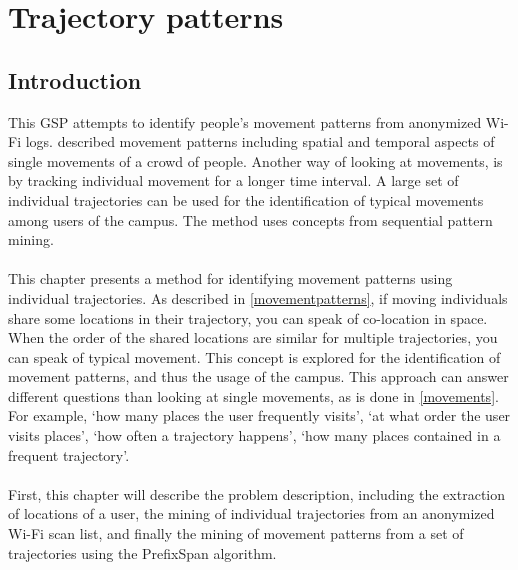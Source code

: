 \chapter{Trajectory patterns}\label{trajectories}
\section{Introduction}
This GSP attempts to identify people's movement patterns from anonymized Wi-Fi logs.  described movement patterns including spatial and temporal aspects of single movements of a crowd of people. Another way of looking at movements, is by tracking individual movement for a longer time interval. A large set of individual trajectories can be used for the identification of typical movements among users of the campus. The method uses concepts from sequential pattern mining. \\\\
This chapter presents a method for identifying movement patterns using individual trajectories. As described in \autoref{movementpatterns}, if moving individuals share some locations in their trajectory, you can speak of co-location in space. When the order of the shared locations are similar for multiple trajectories, you can speak of typical movement. This concept is explored for the identification of movement patterns, and thus the usage of the campus. This approach can answer different questions than looking at single movements, as is done in \autoref{movements}. For example, ‘how many places the user frequently visits’, ‘at what order the user visits places’, ‘how often a trajectory happens’, ‘how many places contained in a frequent trajectory’.\\\\
First, this chapter will describe the problem description, including the extraction of locations of a user, the mining of individual trajectories from an anonymized Wi-Fi scan list, and finally the mining of movement patterns from a set of trajectories using the PrefixSpan algorithm.
